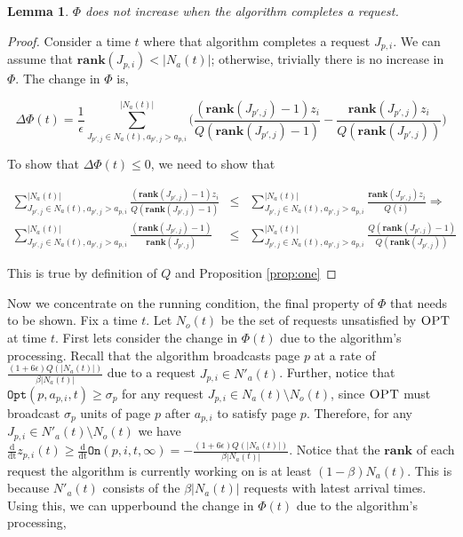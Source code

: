 \documentclass[11pt]{article}
\newtheorem{lemma}{Lemma}[section]
\newcommand{\opt}{\textrm{\sc OPT}}
\newcommand{\eps}{\epsilon}
\newcommand{\On}{\texttt{On}}
\newcommand{\Opt}{\texttt{Opt}}
\newcommand{\ddt}{\frac{\mathrm{d}}{\mathrm{dt}} }
\newcommand{\rank}{\mathbf{rank}}
\begin{document}
\begin{lemma}
\label{lem:comp}
$\Phi$ does not increase when the algorithm completes a request.
\end{lemma}
\begin{proof}

Consider a time $t$ where that algorithm completes a request $J_{p,i}$.   We can assume that $\rank(J_{p,i}) < |N_a(t)|$; otherwise, trivially there is no increase in $\Phi$.   The change in $\Phi$ is,

$$\Delta \Phi(t)  = \frac{1}{\eps}\sum_{J_{p',j} \in N_a(t), a_{p',j} > a_{p,i}}^{|N_a(t)|}  \Big ( \frac{(\rank(J_{p',j}) - 1)z_i}{Q(\rank(J_{p',j})-1)} - \frac{\rank(J_{p',j}) z_i}{Q(\rank(J_{p',j}))} \Big )  $$


To show that $\Delta \Phi(t) \leq 0$, we need to show that 

\begin{eqnarray*}
\sum_{J_{p',j} \in N_a(t), a_{p',j} > a_{p,i}}^{|N_a(t)|} \frac{(\rank(J_{p',j}) - 1)z_i}{Q(\rank(J_{p',j})-1)}  &\leq& \sum_{J_{p',j} \in N_a(t), a_{p',j} > a_{p,i}}^{|N_a(t)|}  \frac{\rank(J_{p',j}) z_i}{Q(i)}   \Rightarrow \\
\sum_{J_{p',j} \in N_a(t), a_{p',j} > a_{p,i}}^{|N_a(t)|} \frac{(\rank(J_{p',j}) - 1)}{\rank(J_{p',j})}  &\leq& \sum_{J_{p',j} \in N_a(t), a_{p',j} > a_{p,i}}^{|N_a(t)|}  \frac{Q(\rank(J_{p',j})-1)}{Q(\rank(J_{p',j}))} 
\end{eqnarray*}

This is true by definition of $Q$ and Proposition \ref{prop:one}
\end{proof}



Now we concentrate on the running condition, the final property of $\Phi$ that needs to be shown.   Fix a time $t$.  Let $N_o(t)$ be the set of requests unsatisfied by $\opt$ at time $t$.  First lets consider the change in $\Phi(t)$ due to the algorithm's processing.   Recall that the algorithm broadcasts page $p$ at a rate of $\frac{(1+6\eps)Q(|N_a(t)|)}{\beta |N_a(t)|}$ due to a request $J_{p,i} \in N'_a(t)$.  Further, notice that $\Opt(p,a_{p,i}, t) \geq \sigma_p$ for any request $J_{p,i} \in N_a(t) \setminus N_o(t)$, since $\opt$ must broadcast $\sigma_p$ units of page $p$ after $a_{p,i}$ to satisfy page $p$.  Therefore, for any $J_{p,i} \in N'_a(t) \setminus N_o(t)$ we have $\ddt z_{p,i}(t) \geq \ddt \On(p,i,t,\infty) =  -\frac{(1+6\eps)Q(|N_a(t)|)}{\beta |N_a(t)|} $. Notice that the $\rank$ of each request the algorithm  is currently working on is at least $(1-\beta)N_a(t)$.  This is because $N'_a(t)$ consists of the $\beta|N_a(t)|$ requests with latest arrival times.  Using this, we can upperbound the change in $\Phi(t)$ due to the algorithm's processing,
\end{document}

